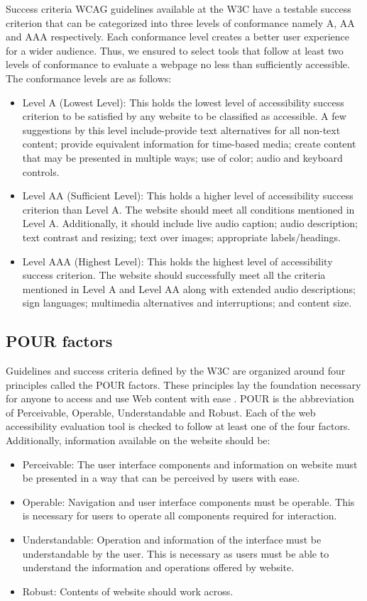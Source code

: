 \documentclass{IEEEtran}
\begin{document}
Success criteria WCAG guidelines available at the W3C have a testable success criterion \cite{W3C2008} that can be categorized into three levels of conformance namely A, AA and AAA respectively. Each conformance level creates a better user experience for a wider audience. Thus, we ensured to select tools that follow at least two levels of conformance to evaluate a webpage no less than sufficiently accessible. The conformance levels are as follows:
\begin{itemize}
    \item Level A (Lowest Level): This holds the lowest level of accessibility success criterion to be satisfied by any website to be classified as accessible. A few suggestions by this level include-provide text alternatives for all non-text content; provide equivalent information for time-based media; create content that may be presented in multiple ways; use of color; audio and keyboard controls. 
    \item Level AA (Sufficient Level): This holds a higher level of accessibility success criterion than Level A. The website should meet all conditions mentioned in Level A. Additionally, it should include live audio caption; audio description; text contrast and resizing; text over images; appropriate labels/headings.
    \item Level AAA (Highest Level): This holds the highest level of accessibility success criterion. The website should successfully meet all the criteria mentioned in Level A and Level AA along with extended audio descriptions; sign languages; multimedia alternatives and interruptions; and content size.
\end{itemize} 

\subsection{POUR factors}
Guidelines and success criteria defined by the W3C are organized around four principles called the POUR factors. These principles lay the foundation necessary for anyone to access and use Web content with ease \cite{Moorman1999}. POUR is the abbreviation of Perceivable, Operable, Understandable and Robust. Each of the web accessibility evaluation tool is checked to follow at least one of the four factors. Additionally, information available on the website should be:


\begin{itemize}
    \item Perceivable: The user interface components and information on website must be presented in a way that can be perceived by users with ease.
    \item Operable: Navigation and user interface components must be operable. This is necessary for users to operate all components required for interaction.
    \item Understandable: Operation and information of the interface must be understandable by the user. This is necessary as users must be able to understand the information and operations offered by website.
    \item Robust: Contents of website should work across.
\end{itemize}
\end{document}

